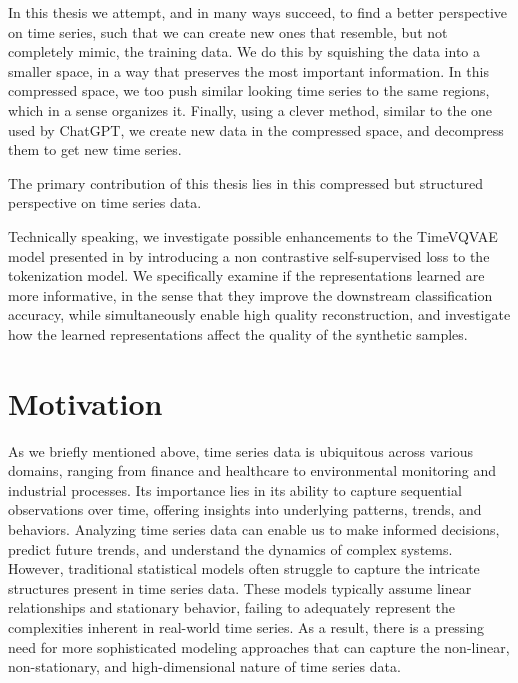 \documentclass[../../thesis.tex]{subfiles}
\begin{document}
In this thesis we attempt, and in many ways succeed, to find a better perspective on time series, such that we can create new ones that resemble, but not completely mimic, the training data. We do this by squishing the data into a smaller space, in a way that preserves the most important information. In this compressed space, we too push similar looking time series to the same regions, which in a sense organizes it. Finally, using a clever method, similar to the one used by ChatGPT, we create new data in the compressed space, and decompress them to get new time series.\newline

The primary contribution of this thesis lies in this compressed but structured perspective on time series data.
\newline

Technically speaking, we investigate possible enhancements to the TimeVQVAE model presented in \cite{TimeVQVAE} by introducing a non contrastive self-supervised loss to the tokenization model. We specifically examine if the representations learned are more informative, in the sense that they improve the downstream classification accuracy, while simultaneously enable high quality reconstruction, and investigate how the learned representations affect the quality of the synthetic samples.

\section{Motivation}

As we briefly mentioned above, time series data is ubiquitous across various domains, ranging from finance and healthcare to environmental monitoring and industrial processes. Its importance lies in its ability to capture sequential observations over time, offering insights into underlying patterns, trends, and behaviors. Analyzing time series data can enable us to make informed decisions, predict future trends, and understand the dynamics of complex systems.
However, traditional statistical models often struggle to capture the intricate structures present in time series data. These models typically assume linear relationships and stationary behavior, failing to adequately represent the complexities inherent in real-world time series. As a result, there is a pressing need for more sophisticated modeling approaches that can capture the non-linear, non-stationary, and high-dimensional nature of time series data.\newline
\end{document}
